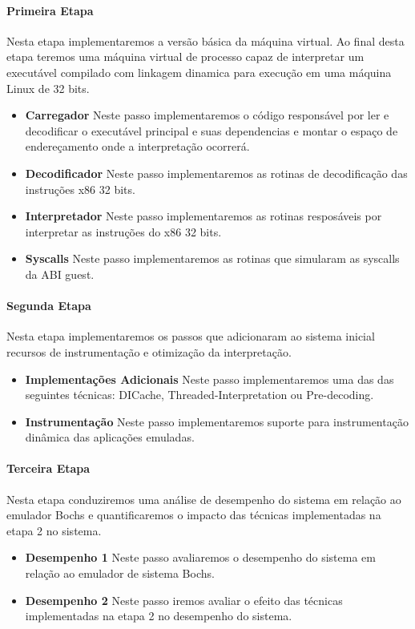 \documentclass[11pt,twoside]{article}
\begin{document}
\paragraph{Primeira Etapa} Nesta etapa implementaremos a versão básica da 
máquina virtual. Ao final desta etapa teremos uma máquina virtual de
processo capaz de interpretar um executável compilado com linkagem
dinamica para execução em uma máquina Linux de 32 bits.
	\begin{itemize}
		\item \textbf{Carregador} Neste passo implementaremos o código responsável
		por ler e decodificar o executável principal e suas dependencias
		e montar o espaço de endereçamento onde a interpretação ocorrerá.
		\item \textbf{Decodificador} Neste passo implementaremos as rotinas de 
		decodificação das instruções x86 32 bits.
		\item \textbf{Interpretador} Neste passo implementaremos as rotinas 
		resposáveis por interpretar as instruções do x86 32 bits.
		\item \textbf{Syscalls} Neste passo implementaremos as rotinas que simularam
		as syscalls da ABI guest.
	\end{itemize}

\paragraph{Segunda Etapa} Nesta etapa implementaremos os passos que adicionaram
ao sistema inicial recursos de instrumentação e otimização da interpretação.
	\begin{itemize}
		\item \textbf{Implementações Adicionais} Neste passo implementaremos uma das
		das seguintes técnicas: DICache, Threaded-Interpretation ou Pre-decoding.
		\item \textbf{Instrumentação} Neste passo implementaremos suporte para 
		instrumentação dinâmica das aplicações emuladas.
	\end{itemize}
 
\paragraph{Terceira Etapa} Nesta etapa conduziremos uma análise de desempenho do sistema
em relação ao emulador Bochs e quantificaremos o impacto das técnicas implementadas
na etapa 2 no sistema.
	\begin{itemize}
		\item \textbf{Desempenho 1} Neste passo avaliaremos o desempenho do sistema
		em relação ao emulador de sistema Bochs.
		\item \textbf{Desempenho 2} Neste passo iremos avaliar o efeito das técnicas 
		implementadas na etapa 2 no desempenho do sistema.
	\end{itemize}
\end{document}
